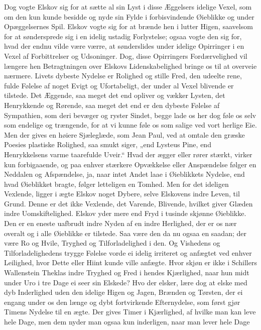 \documentclass[12pt,a4paper]{book}
\newcommand{\apage}[1]{\marginnote{\footnotesize\textit{[#1]}}}
\begin{document}
Dog vogte Elskov sig for at sætte al sin Lyst i disse Æggelsers idelige
Vexel, som om den kun kunde besidde og nyde sin Fylde i forbisvindende
Øieblikke og under Opæggelsernes Spil. Elskov vogte sig for at brænde
hen i lutter Higen, saavelsom for at søndersprede sig i en idelig
ustadig Forlystelse; ogsaa vogte den sig for, hvad der endnu vilde være
værre, at sønderslides under idelige Opirringer i en Vexel af
Forbittrelser og Udsoninger. Dog, disse Opirringers Fordærvelighed vil
længere hen Betragtningen over Elskovs Lidenskabelighed bringe os til at
overveie nærmere. Livets dybeste Nydelse er Rolighed og stille Fred, den
udeelte rene, fulde Følelse af noget Evigt og Ufortabeligt, der under al
Vexel blivende er tilstede. Det Æggende, saa meget det end opliver og
vækker Lysten, \apage{54} det Henrykkende og Rørende, saa meget det end er den
dybeste Følelse af Sympathien, som deri bevæger og ryster Sindet, begge
lade os her dog føle os selv som endelige og trængende, for at vi kunne
føle os som salige ved vort herlige Eie. Men der gives en høiere
Sjæleglæde, som Jean Paul, ved at omtale den græske Poesies plastiske
Rolighed, saa smukt siger, „end Lysteus Pine, end Henrykkelsens varme
taarefulde Uveir.“ Hvad der ægger eller rører stærkt, virker kun
forbigaaende, og paa enhver stærkere Opvækkelse eller Anspændelse følger
en Neddalen og Afspændelse, ja, naar intet Andet laae i Øieblikkets
Nydelse, end hvad Øieblikket bragte, følger letteligen en Tomhed. Men
for det ideligen Vexlende, ligger i ægte Elskov noget Dybere, selve
Elskovens indre Leven, til Grund. Denne er det ikke Vexlende, det
Varende, Blivende, hvilket giver Glæden indre Uomskiftelighed. Elskov
yder mere end Fryd i tusinde skjønne Øieblikke. Den er en eneste
uafbrudt indre Nyden af en indre Herlighed, der er os nær overalt og i
alle Øieblikke er tilstede. Saa være den da nu ogsaa en saadan; der være
Ro og Hvile, Tryghed og Tilforladelighed i den. Og Vishedens og
Tilforladelighedens trygge Følelse vorde ei idelig irriteret og anfægtet
ved enhver Leilighed, hvor Dette eller Hiint kunde ville anfægte. Hvor
skjøn er ikke i Schillers Wallenstein Theklas indre Tryghed og Fred i
hendes Kjærlighed, naar hun midt under Uro i tre Dage ei seer sin
Elskede? Hvo der elsker, lære \apage{55} dog at elske med dyb Inderlighed uden den
idelige Higen og Jagen, Brænden og Tørsten, der ei engang under os den
længe og dybt fortvirkende Efternydelse, som først gjør Timens Nydelse
til en ægte. Der gives Timer i Kjærlighed, af hvilke man kan leve hele
Dage, men dem nyder man ogsaa kun inderligen, naar man lever hele Dage
\end{document}
